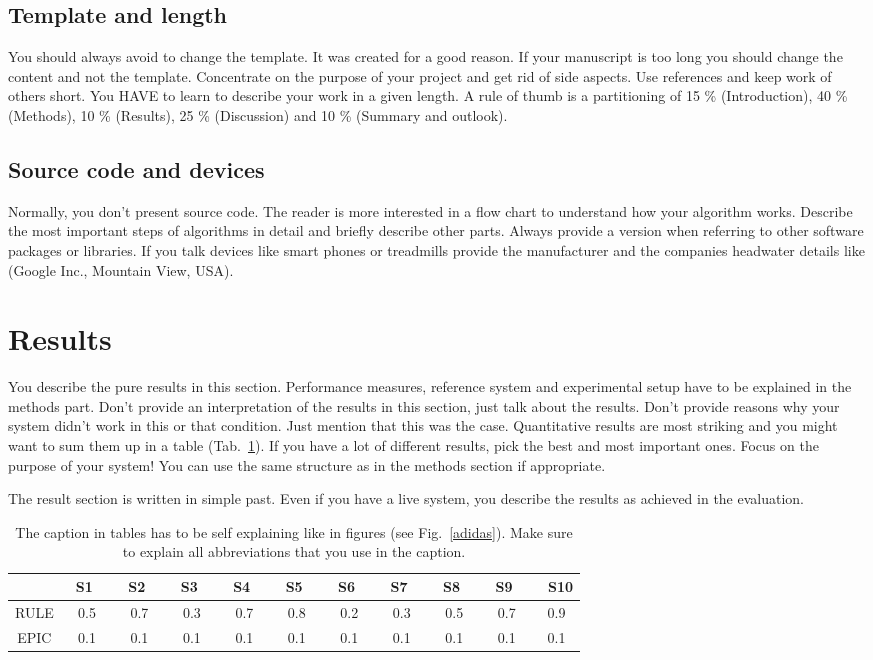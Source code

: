 \documentclass[conference]{IEEEtran}
\begin{document}
\subsection{Template and length}
You should always avoid to change the template. It was created for a good reason. If your manuscript is too long you should change the content and not the template. Concentrate on the purpose of your project and get rid of side aspects. Use references and keep work of others short. You HAVE to learn to describe your work in a given length. A rule of thumb is a partitioning of 15 \% (Introduction), 40 \% (Methods), 10 \% (Results), 25 \% (Discussion) and 10 \% (Summary and outlook).

\subsection{Source code and devices}
Normally, you don't present source code. The reader is more interested in a flow chart to understand how your algorithm works.  Describe the most important steps of algorithms in detail and briefly describe other parts. Always provide a version when referring to other software packages or libraries. 
If you talk devices like smart phones or treadmills provide the manufacturer and the companies headwater details like (Google Inc., Mountain View, USA). 

\section{Results}
You describe the pure results in this section. Performance measures, reference system and experimental setup have to be explained in the methods part. Don't provide an interpretation of the results in this section, just talk about the results. Don't provide reasons why your system didn't work in this or that condition. Just mention that this was the case. Quantitative results are most striking and you might want to sum them up in a table (Tab.~\ref{result_table}). If you have a lot of different results, pick the best and most important ones. Focus on the purpose of your system! You can use the same structure as in the methods section if appropriate.

The result section is written in simple past. Even if you have a live system, you describe the results as achieved in the evaluation. 

\begin{table}[!t]
\caption{The caption in tables has to be self explaining like in figures (see Fig.~\ref{adidas}). Make sure to explain all abbreviations that you use in the caption.}
\begin{center}
\begin{tabular}{c|cccccccccc}
& \ S1 \ &\ S2 \ &\ S3 \ & \ S4 \ & \ S5 \ & \ S6 \ & \ S7 \ & \ S8 \ & \ S9 \ & \ S10\\
\hline
RULE&0.5&0.7&0.3&0.7&0.8&0.2&0.3&0.5&0.7&0.9\\
EPIC&0.1&0.1&0.1&0.1&0.1&0.1&0.1&0.1&0.1&0.1\\
\end{tabular}
\label{result_table}
\end{center}
\end{table}
\end{document}
